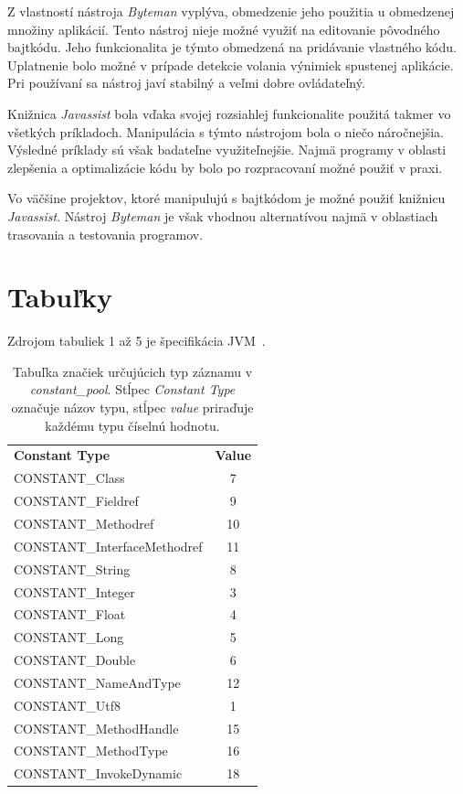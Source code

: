 \documentclass[11pt,final,oneside]{fithesis}
\begin{document}
Z vlastností nástroja \textit{Byteman} vyplýva, obmedzenie jeho použitia u
obmedzenej množiny aplikácií. Tento nástroj nieje možné využiť na 
editovanie pôvodného bajtkódu. Jeho funkcionalita je týmto obmedzená
na pridávanie vlastného kódu. Uplatnenie bolo možné v prípade
detekcie volania výnimiek spustenej aplikácie. Pri používaní sa nástroj javí
stabilný a veľmi dobre ovládateľný.

Knižnica \textit{Javassist} bola vďaka svojej rozsiahlej funkcionalite použitá
takmer vo všetkých príkladoch. Manipulácia s týmto nástrojom bola o niečo
náročnejšia. Výsledné príklady sú však badateľne využiteľnejšie. Najmä
programy v oblasti zlepšenia a optimalizácie kódu by bolo po rozpracovaní možné
použiť v praxi.

Vo väčšine projektov, ktoré manipulujú s bajtkódom je možné použiť knižnicu
\textit{Javassist}. Nástroj \textit{Byteman} je však vhodnou alternatívou najmä
v oblastiach trasovania a testovania programov.

\nocite{RedHat:Javassist}
\clearpage
{} 
 
 

\appendix

\chapter{Tabuľky}

Zdrojom tabuliek 1 až 5 je špecifikácia
JVM~\cite{Lindholm:2013:JVM:2462629}.

\begin{table}
  \begin{tabular}{| l | c |}
    \hline
    \textbf{Constant Type} & \textbf{Value} \\
    \hhline{|=|=|}
    CONSTANT\_Class & 7 \\ \hline
    CONSTANT\_Fieldref & 9 \\ \hline
    CONSTANT\_Methodref & 10 \\ \hline
    CONSTANT\_InterfaceMethodref & 11 \\ \hline
    CONSTANT\_String & 8 \\ \hline
    CONSTANT\_Integer & 3 \\ \hline
    CONSTANT\_Float & 4 \\ \hline
    CONSTANT\_Long & 5 \\ \hline
    CONSTANT\_Double & 6 \\ \hline
    CONSTANT\_NameAndType & 12 \\ \hline
    CONSTANT\_Utf8 & 1 \\ \hline
    CONSTANT\_MethodHandle & 15 \\ \hline
    CONSTANT\_MethodType & 16 \\ \hline
    CONSTANT\_InvokeDynamic & 18 \\
    \hline
  \end{tabular}
  \caption{Tabuľka značiek určujúcich typ záznamu v \textit{constant\_pool}.
  Stĺpec \textit{Constant Type} označuje názov typu, stĺpec \textit{value}
  priraďuje každému typu číselnú hodnotu.}
  \label{tab:tab1}
\end{table}
\end{document}
